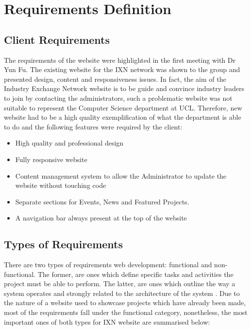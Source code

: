 \documentclass[fontsize=10pt]{extarticle}
\numberwithin{figure}{section} %
\providecommand{\tightlist}{%
  \setlength{\itemsep}{0pt}\setlength{\parskip}{0pt}}
\begin{document}
\newpage

\hypertarget{requirements-definition}{%
\section{Requirements Definition}\label{requirements-definition}}

\hypertarget{client-requirements}{%
\subsection{Client Requirements}\label{client-requirements}}

The requirements of the website were highlighted in the first meeting
with Dr Yun Fu. The existing website for the IXN network was shown to
the group and presented design, content and responsiveness issues. In
fact, the aim of the Industry Exchange Network website is to be guide
and convince industry leaders to join by contacting the administrators,
such a problematic website was not suitable to represent the Computer
Science department at UCL. Therefore, new website had to be a high
quality exemplification of what the department is able to do and the
following features were required by the client:

\begin{itemize}
\tightlist
\item
  High quality and professional design
\item
  Fully responsive website
\item
  Content management system to allow the Administrator to update the
  website without touching code
\item
  Separate sections for Events, News and Featured Projects.
\item
  A navigation bar always present at the top of the website
\end{itemize}

\hypertarget{types-of-requirements}{%
\subsection{Types of Requirements}\label{types-of-requirements}}

There are two types of requirements web development: functional and
non-functional. The former, are ones which define specific tasks and
activities the project must be able to perform. The latter, are ones
which outline the way a system operates and strongly related to the
architecture of the system \cite{g5}. Due to the nature of a website
used to showcase projects which have already been made, most of the
requirements fall under the functional category, nonetheless, the most
important ones of both types for IXN website are summarised below:
\end{document}
